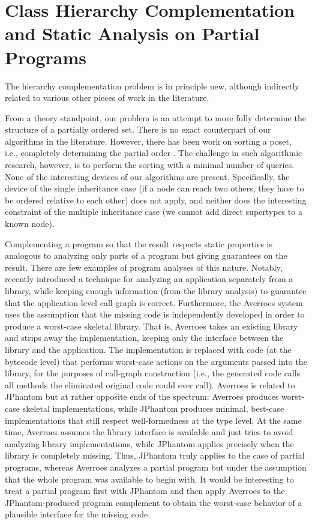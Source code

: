 \section{Class Hierarchy Complementation and Static Analysis on
  Partial Programs}
\label{related:sect/complementation}

The hierarchy complementation problem is in principle new, although
indirectly related to various other pieces of work in the literature.

From a theory standpoint, our problem is an attempt to more fully
determine the structure of a partially ordered set. There is no exact
counterpart of our algorithms in the literature. However, there has
been work on sorting a poset, i.e., completely determining the partial
order \cite{soda/DaskalakisKMRV09}.  The challenge in such algorithmic
research, however, is to perform the sorting with a minimal number of
queries. None of the interesting devices of our algorithms are
present. Specifically, the device of the single inheritance case (if a
node can reach two others, they have to be ordered relative to each
other) does not apply, and neither does the interesting constraint of
the multiple inheritance case (we cannot add direct supertypes to a
known node).

Complementing a program so that the result respects static properties
is analogous to analyzing only parts of a program but giving
guarantees on the result. There are few examples of program analyses
of this nature. Notably, \citeauthor{ecoop/AliL12} recently introduced
a technique \cite{ecoop/AliL12} for analyzing an application
separately from a library, while keeping enough information (from the
library analysis) to guarantee that the application-level call-graph
is correct. Furthermore, the Averroes system \cite{ecoop/AliL13} uses
the assumption that the missing code is independently developed in
order to produce a worst-case skeletal library. That is, Averroes
takes an existing library and strips away the implementation, keeping
only the interface between the library and the application. The
implementation is replaced with code (at the bytecode level) that
performs worst-case actions on the arguments passed into the library,
for the purposes of call-graph construction (i.e., the generated code
calls all methods the eliminated original code could ever
call). Averroes is related to JPhantom but at rather opposite ends of
the spectrum: Averroes produces worst-case skeletal implementations,
while JPhantom produces minimal, best-case implementations that still
respect well-formedness at the type level.  At the same time, Averroes
assumes the library interface is available and just tries to avoid
analyzing library implementations, while JPhantom applies precisely
when the library is completely missing. Thus, JPhantom truly applies
to the case of partial programs, whereas Averroes analyzes a partial
program but under the assumption that the whole program was available
to begin with. It would be interesting to treat a partial program
first with JPhantom and then apply Averroes to the JPhantom-produced
program complement to obtain the worst-case behavior of a plausible
interface for the missing code.

